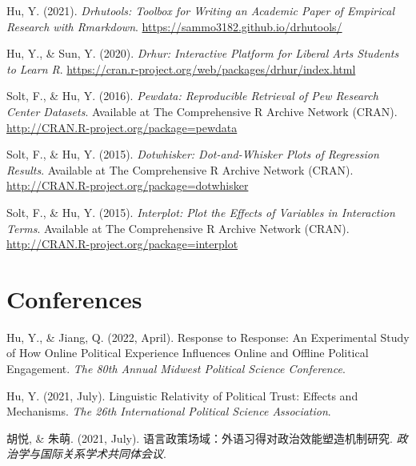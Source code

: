 \documentclass[11pt,a4paper,]{awesome-cv}
\begin{document}
\leavevmode{}%
Hu, Y. (2021). \emph{Drhutools: Toolbox for Writing an Academic Paper of
Empirical Research with Rmarkdown}.
\url{https://sammo3182.github.io/drhutools/}

\leavevmode{}%
Hu, Y., \& Sun, Y. (2020). \emph{Drhur: Interactive Platform for Liberal
Arts Students to Learn R}.
\url{https://cran.r-project.org/web/packages/drhur/index.html}

\leavevmode{}%
Solt, F., \& Hu, Y. (2016). \emph{Pewdata: Reproducible Retrieval of Pew
Research Center Datasets}. Available at The Comprehensive R Archive
Network (CRAN). \url{http://CRAN.R-project.org/package=pewdata}

\leavevmode{}%
Solt, F., \& Hu, Y. (2015). \emph{Dotwhisker: Dot-and-Whisker Plots of
Regression Results}. Available at The Comprehensive R Archive Network
(CRAN). \url{http://CRAN.R-project.org/package=dotwhisker}

\leavevmode{}%
Solt, F., \& Hu, Y. (2015). \emph{Interplot: Plot the Effects of
Variables in Interaction Terms}. Available at The Comprehensive R
Archive Network (CRAN).
\url{http://CRAN.R-project.org/package=interplot}

\endgroup

\hypertarget{conferences}{%
\section{Conferences}\label{conferences}}

\begingroup
\setlength{\parindent}{-0.5in}
\setlength{\leftskip}{0.5in}

\hypertarget{bibliography}{}
\leavevmode{}%
Hu, Y., \& Jiang, Q. (2022, April). Response to Response: An
Experimental Study of How Online Political Experience Influences Online
and Offline Political Engagement. \emph{The 80th Annual Midwest
Political Science Conference}.

\leavevmode{}%
Hu, Y. (2021, July). Linguistic Relativity of Political Trust: Effects
and Mechanisms. \emph{The 26th International Political Science
Association}.

\leavevmode{}%
胡悦, \& 朱萌. (2021, July).
语言政策场域：外语习得对政治效能塑造机制研究.
\emph{政治学与国际关系学术共同体会议}.
\end{document}

